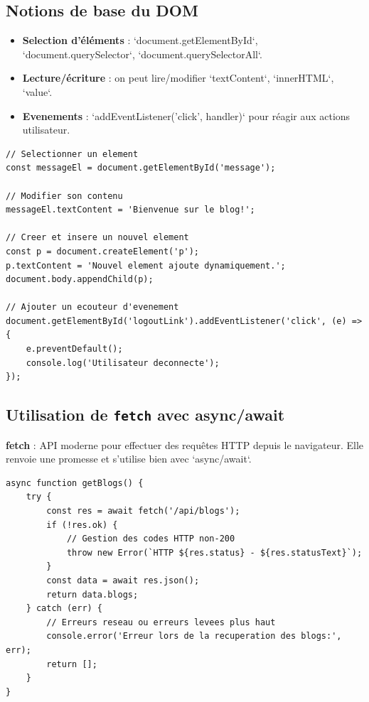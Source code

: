 \documentclass[a4paper,12pt]{book}
\begin{document}
\subsection{Notions de base du DOM}

\begin{itemize}
    \item \textbf{Selection d'\'el\'ements} : `document.getElementById`, `document.querySelector`, `document.querySelectorAll`.
    \item \textbf{Lecture/\'ecriture} : on peut lire/modifier `textContent`, `innerHTML`, `value`.
    \item \textbf{Evenements} : `addEventListener('click', handler)` pour r\'eagir aux actions utilisateur.
\end{itemize}

\begin{lstlisting}[style=javascript,caption=Exemple DOM - selection et manipulation simple]
// Selectionner un element
const messageEl = document.getElementById('message');

// Modifier son contenu
messageEl.textContent = 'Bienvenue sur le blog!';

// Creer et insere un nouvel element
const p = document.createElement('p');
p.textContent = 'Nouvel element ajoute dynamiquement.';
document.body.appendChild(p);

// Ajouter un ecouteur d'evenement
document.getElementById('logoutLink').addEventListener('click', (e) => {
    e.preventDefault();
    console.log('Utilisateur deconnecte');
});
\end{lstlisting}

\subsection{Utilisation de \texttt{fetch} avec async/await}

\begin{definitionbox}
    \textbf{fetch} : API moderne pour effectuer des requ\^etes HTTP depuis le navigateur. Elle renvoie une promesse et s'utilise bien avec `async/await`.
\end{definitionbox}

\begin{lstlisting}[style=javascript,caption=Exemple fetch - requete GET avec gestion d'erreur]
async function getBlogs() {
    try {
        const res = await fetch('/api/blogs');
        if (!res.ok) {
            // Gestion des codes HTTP non-200
            throw new Error(`HTTP ${res.status} - ${res.statusText}`);
        }
        const data = await res.json();
        return data.blogs;
    } catch (err) {
        // Erreurs reseau ou erreurs levees plus haut
        console.error('Erreur lors de la recuperation des blogs:', err);
        return [];
    }
}
\end{lstlisting}
\end{document}
